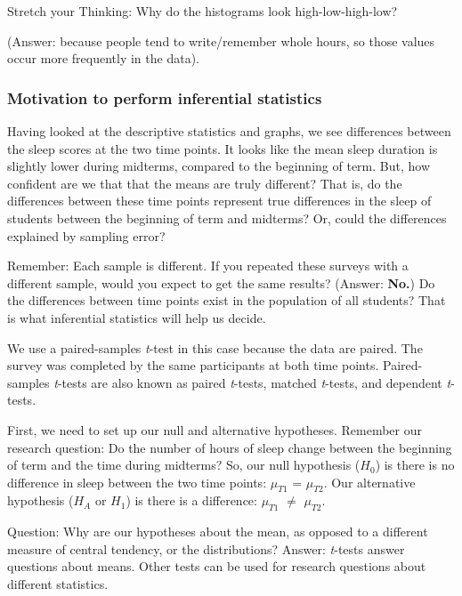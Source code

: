 \documentclass[
]{book}
\begin{document}
Stretch your Thinking: Why do the histograms look high-low-high-low?

(Answer: because people tend to write/remember whole hours, so those values occur more frequently in the data).

\hypertarget{motivation-to-perform-inferential-statistics}{%
\subsubsection{Motivation to perform inferential statistics}\label{motivation-to-perform-inferential-statistics}}

Having looked at the descriptive statistics and graphs, we see differences between the sleep scores at the two time points. It looks like the mean sleep duration is slightly lower during midterms, compared to the beginning of term. But, how confident are we that that the means are truly different? That is, do the differences between these time points represent true differences in the sleep of students between the beginning of term and midterms? Or, could the differences explained by sampling error?

Remember: Each sample is different. If you repeated these surveys with a different sample, would you expect to get the same results? (Answer: \textbf{No.}) Do the differences between time points exist in the population of all students? That is what inferential statistics will help us decide.

We use a paired-samples \emph{t}-test in this case because the data are paired. The survey was completed by the same participants at both time points. Paired-samples \emph{t}-tests are also known as paired \emph{t}-tests, matched \emph{t}-tests, and dependent \emph{t}-tests.

First, we need to set up our null and alternative hypotheses. Remember our research question: Do the number of hours of sleep change between the beginning of term and the time during midterms?
So, our null hypothesis (\(H_0\)) is there is no difference in sleep between the two time points: \(\mu_{T1}\) = \(\mu_{T2}\).
Our alternative hypothesis (\(H_A\) or \(H_1\)) is there is a difference: \(\mu_{T1}\) \(\neq\) \(\mu_{T2}\).

Question: Why are our hypotheses about the mean, as opposed to a different measure of central tendency, or the distributions? Answer: \emph{t}-tests answer questions about means. Other tests can be used for research questions about different statistics.
\end{document}
